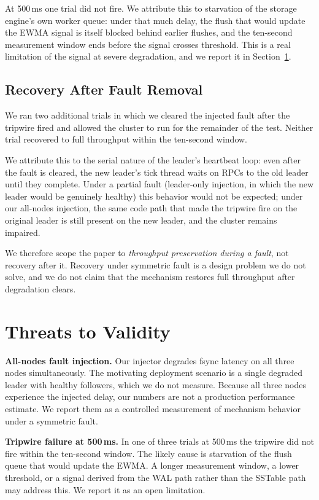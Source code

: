 \documentclass[conference, a4paper]{IEEEtran}
\begin{document}
At 500\,ms one trial did not fire. We attribute this to starvation of
the storage engine's own worker queue: under that much delay, the flush
that would update the EWMA signal is itself blocked behind earlier
flushes, and the ten-second measurement window ends before the signal
crosses threshold. This is a real limitation of the signal at severe
degradation, and we report it in Section~\ref{sec:threats}.

\subsection{Recovery After Fault Removal}

We ran two additional trials in which we cleared the injected fault
after the tripwire fired and allowed the cluster to run for the
remainder of the test. Neither trial recovered to full throughput
within the ten-second window.

We attribute this to the serial nature of the leader's heartbeat loop:
even after the fault is cleared, the new leader's tick thread waits on
RPCs to the old leader until they complete. Under a partial fault
(leader-only injection, in which the new leader would be genuinely
healthy) this behavior would not be expected; under our all-nodes
injection, the same code path that made the tripwire fire on the
original leader is still present on the new leader, and the cluster
remains impaired.

We therefore scope the paper to \emph{throughput preservation during a
fault}, not recovery after it. Recovery under symmetric fault is a
design problem we do not solve, and we do not claim that the mechanism
restores full throughput after degradation clears.

\section{Threats to Validity}
\label{sec:threats}

\textbf{All-nodes fault injection.} Our injector degrades fsync latency
on all three nodes simultaneously. The motivating deployment scenario is
a single degraded leader with healthy followers, which we do not
measure. Because all three nodes experience the injected delay, our
numbers are not a production performance estimate. We report them as a
controlled measurement of mechanism behavior under a symmetric fault.

\textbf{Tripwire failure at 500\,ms.} In one of three trials at 500\,ms
the tripwire did not fire within the ten-second window. The likely cause
is starvation of the flush queue that would update the EWMA. A longer
measurement window, a lower threshold, or a signal derived from the WAL
path rather than the SSTable path may address this. We report it as an
open limitation.
\end{document}
